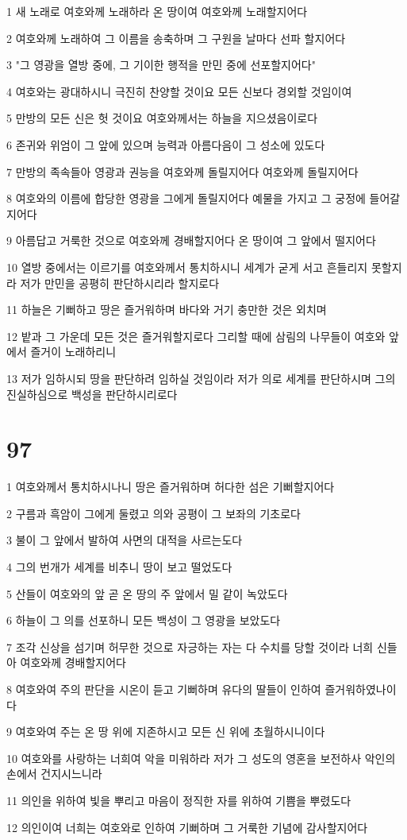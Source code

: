 \par 1 새 노래로 여호와께 노래하라 온 땅이여 여호와께 노래할지어다
\par 2 여호와께 노래하여 그 이름을 송축하며 그 구원을 날마다 선파 할지어다
\par 3 "그 영광을 열방 중에, 그 기이한 행적을 만민 중에 선포할지어다"
\par 4 여호와는 광대하시니 극진히 찬양할 것이요 모든 신보다 경외할 것임이여
\par 5 만방의 모든 신은 헛 것이요 여호와께서는 하늘을 지으셨음이로다
\par 6 존귀와 위엄이 그 앞에 있으며 능력과 아름다음이 그 성소에 있도다
\par 7 만방의 족속들아 영광과 권능을 여호와께 돌릴지어다 여호와께 돌릴지어다
\par 8 여호와의 이름에 합당한 영광을 그에게 돌릴지어다 예물을 가지고 그 궁정에 들어갈지어다
\par 9 아름답고 거룩한 것으로 여호와께 경배할지어다 온 땅이여 그 앞에서 떨지어다
\par 10 열방 중에서는 이르기를 여호와께서 통치하시니 세계가 굳게 서고 흔들리지 못할지라 저가 만민을 공평히 판단하시리라 할지로다
\par 11 하늘은 기뻐하고 땅은 즐거워하며 바다와 거기 충만한 것은 외치며
\par 12 밭과 그 가운데 모든 것은 즐거워할지로다 그리할 때에 삼림의 나무들이 여호와 앞에서 즐거이 노래하리니
\par 13 저가 임하시되 땅을 판단하려 임하실 것임이라 저가 의로 세계를 판단하시며 그의 진실하심으로 백성을 판단하시리로다

\chapter{97}

\par 1 여호와께서 통치하시나니 땅은 즐거워하며 허다한 섬은 기뻐할지어다
\par 2 구름과 흑암이 그에게 둘렸고 의와 공평이 그 보좌의 기초로다
\par 3 불이 그 앞에서 발하여 사면의 대적을 사르는도다
\par 4 그의 번개가 세계를 비추니 땅이 보고 떨었도다
\par 5 산들이 여호와의 앞 곧 온 땅의 주 앞에서 밀 같이 녹았도다
\par 6 하늘이 그 의를 선포하니 모든 백성이 그 영광을 보았도다
\par 7 조각 신상을 섬기며 허무한 것으로 자긍하는 자는 다 수치를 당할 것이라 너희 신들아 여호와께 경배할지어다
\par 8 여호와여 주의 판단을 시온이 듣고 기뻐하며 유다의 딸들이 인하여 즐거워하였나이다
\par 9 여호와여 주는 온 땅 위에 지존하시고 모든 신 위에 초월하시니이다
\par 10 여호와를 사랑하는 너희여 악을 미워하라 저가 그 성도의 영혼을 보전하사 악인의 손에서 건지시느니라
\par 11 의인을 위하여 빛을 뿌리고 마음이 정직한 자를 위하여 기쁨을 뿌렸도다
\par 12 의인이여 너희는 여호와로 인하여 기뻐하며 그 거룩한 기념에 감사할지어다

